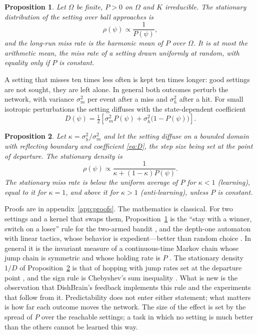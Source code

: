 \documentclass[12pt]{article}
\newtheorem{proposition}{Proposition}
\numberwithin{equation}{section}
\begin{document}
\begin{proposition}\label{prop:exact}
Let $\Omega$ be finite, $P>0$ on $\Omega$ and $K$ irreducible. The stationary distribution of the setting over ball approaches is
\begin{equation}
\rho(\psi)\propto\frac{1}{P(\psi)},
\end{equation}
and the long-run miss rate is the harmonic mean of $P$ over $\Omega$. It is at most the arithmetic mean, the miss rate of a setting drawn uniformly at random, with equality only if $P$ is constant.
\end{proposition}

A setting that misses ten times less often is kept ten times longer: good settings are not sought, they are left alone. In general both outcomes perturb the network, with variance $\sigma_m^2$ per event after a miss and $\sigma_h^2$ after a hit. For small isotropic perturbations the setting diffuses with the state-dependent coefficient
\begin{equation}
D(\psi)=\tfrac12\left[\sigma_m^2P(\psi)+\sigma_h^2\bigl(1-P(\psi)\bigr)\right].
\label{eq:D}
\end{equation}

\begin{proposition}\label{prop:kappa}
Let $\kappa=\sigma_h^2/\sigma_m^2$ and let the setting diffuse on a bounded domain with reflecting boundary and coefficient \eqref{eq:D}, the step size being set at the point of departure. The stationary density is
\begin{equation}
\rho(\psi)\propto\frac{1}{\kappa+(1-\kappa)P(\psi)} .
\end{equation}
The stationary miss rate is below the uniform average of $P$ for $\kappa<1$ (learning), equal to it for $\kappa=1$, and above it for $\kappa>1$ (anti-learning), unless $P$ is constant.
\end{proposition}

Proofs are in appendix~\ref{app:proofs}. The mathematics is classical. For two settings and a kernel that swaps them, Proposition~\ref{prop:exact} is the ``stay with a winner, switch on a loser'' rule for the two-armed bandit \citep{Robbins1952}, and the depth-one automaton with linear tactics, whose behavior is expedient---better than random choice \citep{Tsetlin1961,Tsetlin1963}. In general it is the invariant measure of a continuous-time Markov chain whose jump chain is symmetric and whose holding rate is $P$ \citep{Norris1997}. The stationary density $1/D$ of Proposition~\ref{prop:kappa} is that of hopping with jump rates set at the departure point \citep{vanKampen1988,Schnitzer1993}, and the sign rule is Chebyshev's sum inequality \citep{Chebyshev1882}. What is new is the observation that DishBrain's feedback implements this rule and the experiments that follow from it. Predictability does not enter either statement; what matters is how far each outcome moves the network. The size of the effect is set by the spread of $P$ over the reachable settings; a task in which no setting is much better than the others cannot be learned this way.
\end{document}
